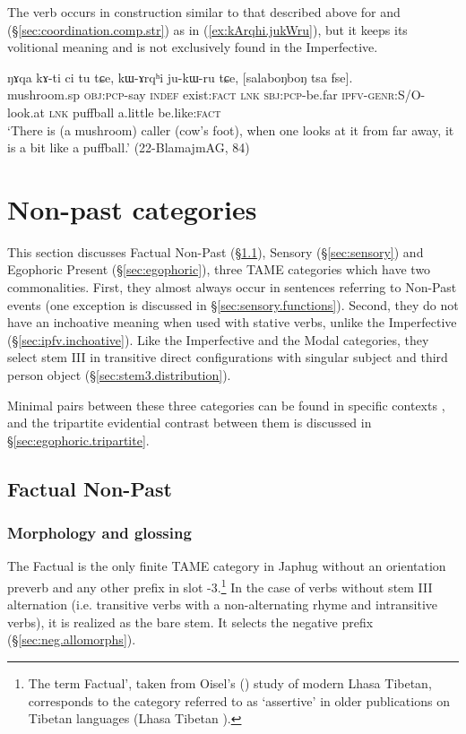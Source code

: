 The verb  occurs in construction similar to that described above for  and  (§\ref{sec:coordination.comp.str}) as in (\ref{ex:kArqhi.jukWru}), but it keeps its volitional meaning and is not exclusively found in the Imperfective.

\begin{exe}
\ex \label{ex:kArqhi.jukWru}
\gll ŋɤqa kɤ-ti ci tu tɕe, kɯ-ɤrqʰi ju-kɯ-ru tɕe, [salaboŋboŋ tsa fse].  \\
mushroom.sp \textsc{obj}:\textsc{pcp}-say \textsc{indef} exist:\textsc{fact} \textsc{lnk} \textsc{sbj}:\textsc{pcp}-be.far \textsc{ipfv}-\textsc{genr}:S/O-look.at \textsc{lnk} puffball a.little be.like:\textsc{fact} \\
\glt `There is (a mushroom) caller  (cow's foot), when one looks at it from far away, it is a bit like a puffball.' (22-BlamajmAG, 84)
\end{exe}

\section{Non-past categories} \label{sec:TAME.npst}
This section discusses Factual Non-Past (§\ref{sec:factual}), Sensory (§\ref{sec:sensory}) and Egophoric Present (§\ref{sec:egophoric}), three TAME categories which have two commonalities. First, they almost always occur in sentences referring to Non-Past events (one exception is discussed in §\ref{sec:sensory.functions}). Second, they do not have an inchoative meaning when used with stative verbs, unlike the Imperfective (§\ref{sec:ipfv.inchoative}). Like the Imperfective and the Modal categories, they select stem III in transitive direct configurations with singular subject and third person object (§\ref{sec:stem3.distribution}).

Minimal pairs between these three categories can be found in specific contexts \citep{jacques19egophoric}, and the tripartite evidential contrast between them is discussed in §\ref{sec:egophoric.tripartite}.

\subsection{Factual Non-Past} \label{sec:factual}
\subsubsection{Morphology and glossing} \label{sec:fact.morphology}
The Factual is the only finite TAME category in Japhug without an orientation preverb and any other prefix in slot -3.\footnote{The term Factual', taken from Oisel's (\citeyear{oisel13aux}) study of modern Lhasa Tibetan, corresponds to the category referred to as `assertive' in older publications on Tibetan languages (Lhasa Tibetan ).} In the case of verbs without stem III alternation (i.e. transitive verbs with a non-alternating rhyme and intransitive verbs), it is realized as the bare stem. It selects the negative prefix  (§\ref{sec:neg.allomorphs}). 

